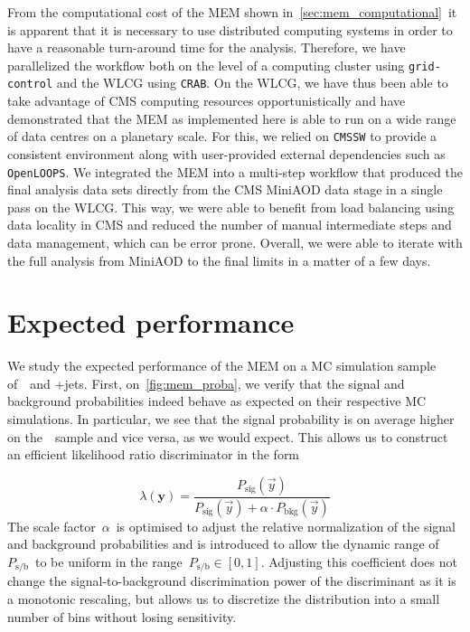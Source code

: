 From the computational cost of the MEM shown in~\cref{sec:mem_computational}~it is apparent that it is necessary to use distributed computing systems in order to have a reasonable turn-around time for the analysis. Therefore, we have parallelized the workflow both on the level of a computing cluster using \texttt{grid-control} and the WLCG using \texttt{CRAB}. On the WLCG, we have thus been able to take advantage of CMS computing resources opportunistically and have demonstrated that the MEM as implemented here is able to run on a wide range of data centres on a planetary scale. For this, we relied on \texttt{CMSSW} to provide a consistent environment along with user-provided external dependencies such as \texttt{OpenLOOPS}. We integrated the MEM into a multi-step workflow that produced the final analysis data sets directly from the CMS MiniAOD data stage in a single pass on the WLCG. This way, we were able to benefit from load balancing using data locality in CMS and reduced the number of manual intermediate steps and data management, which can be error prone. Overall, we were able to iterate with the full analysis from MiniAOD to the final limits in a matter of a few days.

\section{Expected performance}
\label{sec:mem_performace}
We study the expected performance of the MEM on a MC simulation sample of~\ttHbb~and \ttbar+jets. First, on~\cref{fig:mem_proba}, we verify that the signal and background probabilities indeed behave as expected on their respective MC simulations. In particular, we see that the signal probability is on average higher on the~\ttHbb~sample and vice versa, as we would expect. This allows us to construct an efficient likelihood ratio discriminator in the form

\begin{equation}
\lambda(\mathbf{y}) = \frac{P_{\mathrm{sig}}(\vec{y})}{P_{\mathrm{sig}}(\vec{y}) + \alpha \cdot P_{\mathrm{bkg}}(\vec{y})}
\end{equation}
The scale factor~$\alpha$~is optimised to adjust the relative normalization of the signal and background probabilities and is introduced to allow the dynamic range of~$P_{\mathrm{s}/\mathrm{b}}$~to be uniform in the range~$P_{\mathrm{s}/\mathrm{b}} \in [0, 1]$. Adjusting this coefficient does not change the signal-to-background discrimination power of the discriminant as it is a monotonic rescaling, but allows us to discretize the distribution into a small number of bins without losing sensitivity.

